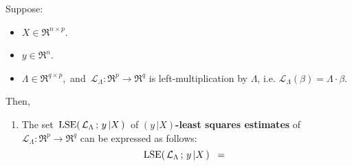 \begin{theorem}
\mbox{}\vskip 0.1cm\noindent
Suppose:
\begin{itemize}
\item
	$X \in \Re^{n \times p}$.
\item
	$y \in \Re^{n}$.
\item
	$\Lambda \in \Re^{q \times p}$,\,
	and
	\,$\mathcal{L}_{\Lambda} : \Re^{p} \longrightarrow \Re^{q}$ is left-multiplication by $\Lambda$,
	i.e. $\mathcal{L}_{\Lambda}(\beta) = \Lambda \cdot \beta$.
\end{itemize}
Then,
\begin{enumerate}
\item
	The set \,$\textnormal{LSE}\!\left(\,\mathcal{L}_{\Lambda} \,;\, y\,\vert X\,\right)$\,
	of \textbf{$(y\,\vert X)$-least squares estimates} of
	\,$\mathcal{L}_{\Lambda} : \Re^{p} \longrightarrow \Re^{q}$
	can be expressed as follows:
	\begin{equation*}
	\textnormal{LSE}\!\left(\,\mathcal{L}_{\Lambda} \,;\, y\,\vert X\,\right)
	\;\; = \;\;
	\end{equation*}
\end{enumerate}
\end{theorem}


